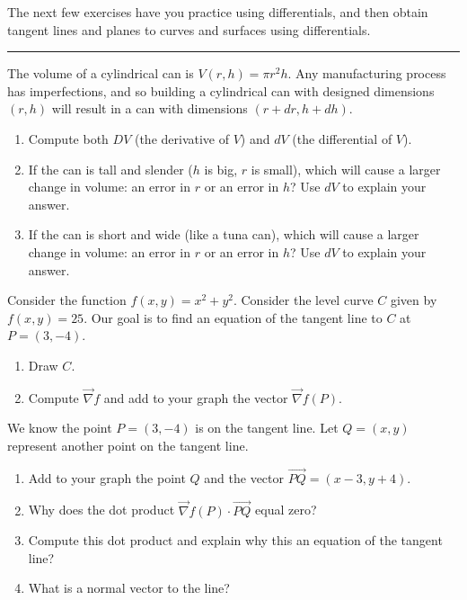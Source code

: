 The next few exercises have you practice using differentials, and then obtain tangent lines and planes to curves and surfaces 	using differentials.

\vskip0.1in
\hrule
\vskip0.1in

\begin{problem}
The volume of a cylindrical can is $V(r,h)=\pi r^2 h$. Any manufacturing process has imperfections, and so building a cylindrical can with designed dimensions $(r,h)$ will result in a can with dimensions $(r+dr,h+dh)$. 
\begin{enumerate}
 \item Compute both $DV$ (the derivative of $V$) and $dV$ (the differential of $V$).
 \item If the can is tall and slender ($h$ is big, $r$ is small), which will cause a larger change in volume: an error in $r$ or an error in $h$? Use $dV$ to explain your answer.
 \item If the can is short and wide (like a tuna can), which will cause a larger change in volume: an error in $r$ or an error in $h$? Use $dV$ to explain your answer.
\end{enumerate}
\end{problem}

\begin{problem}
 Consider the function $f(x,y)=x^2+y^2$.  Consider the level curve $C$ given by $f(x,y)=25$. Our goal is to find an equation of the tangent line to $C$ at $P=(3,-4)$.
\begin{enumerate}
	\item Draw $C$. 
	\item Compute $\vec \nabla f$ and add to your graph the vector $\vec \nabla f(P)$.
\end{enumerate}
We know the point $P=(3,-4)$ is on the tangent line. Let $Q=(x,y)$ represent another point on the tangent line. 
\begin{enumerate}[resume]
	\item Add to your graph the point $Q$ and the vector $\vec {PQ} = (x-3,y+4)$.
  \item Why does the dot product $\vec \nabla f(P)\cdot\vec{PQ}$ equal zero? 
	\item Compute this dot product and explain why this an equation of the tangent line?
  \item What is a normal vector to the line?
\end{enumerate}
\end{problem}

